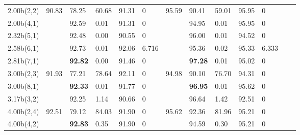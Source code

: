 \documentclass{article}
\theoremstyle{definition}
\theoremstyle{remark}
\begin{document}
\begin{table}[]
\begin{tabular}{|p{1.1cm}| 
    p{0.6cm}| p{0.6cm}| p{0.6cm} |
    p{0.6cm} |p{0.6cm}| p{0.6cm}| 
    p{0.6cm}| p{0.6cm} |p{0.6cm} |
    p{0.6cm}|p{0.6cm}|p{0.6cm}|}
2.00b(2,2)   & \multirow{5}{*}{90.83} & 78.25 &	60.68 & 91.31  &	0      & \multirow{5}{*}{95.59} & 90.41 &	59.01    & 95.95 & 0 \\
2.00b(4,1)   &                        & 92.59 &	0.01  & 91.31  &	0      &                        & 94.95 &	0.01	 & 95.95 & 0 \\
2.32b(5,1)   &                        & 92.48 &	0.00  & 90.55  &	0      &                        & 96.00 &	0.01	 & 94.52 & 0 \\
2.58b(6,1)   &                        & 92.73 &	0.01  & 92.06  &	6.716  &                        & 95.36 &	0.02	 & 95.33 & 6.333 \\
2.81b(7,1)   &                        & \textbf{92.82} &	0.00  & 91.46  &	0      &                        & \textbf{97.28} &	0.01	 & 95.02 & 0 \\  \cline{2-2} \cline{7-7}
3.00b(2,3)   & \multirow{3}{*}{91.93} & 77.21 &	78.64 & 92.11  &	0      & \multirow{3}{*}{94.98} & 90.10 &	76.70    & 94.31 & 0 \\
3.00b(8,1)   &                        & \textbf{92.33} &	0.01  & 91.77  &	0      &                        & \textbf{96.95} &	0.01	 & 95.62 & 0 \\ 
3.17b(3,2)   &                        & 92.25 &	1.14  & 90.66  &	0      &                        & 96.64 &	1.42	 & 92.51 & 0 \\  \cline{2-2} \cline{7-7}
4.00b(2,4)   & \multirow{2}{*}{92.51} & 79.12 &	84.03 & 91.90  &	0      & \multirow{2}{*}{95.62} & 92.36 &	81.96    & 95.21 & 0 \\
4.00b(4,2)   &                        & \textbf{92.83} &	0.35  & 91.90  &	0      &                        & 94.59 &	0.30	 & 95.21 & 0 \\ \hline

\end{tabular}
\end{table}
\end{document}
